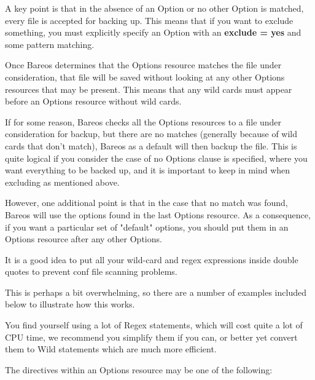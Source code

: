 A key point is that in the absence of an Option or no other Option is
matched, every file is accepted for backing up. This means that if
you want to exclude something, you must explicitly specify an Option
with an {\bf exclude = yes} and some pattern matching.

Once Bareos determines that the Options resource matches the file under
consideration, that file will be saved without looking at any other Options
resources that may be present.  This means that any wild cards must appear
before an Options resource without wild cards.

If for some reason, Bareos checks all the Options resources to a file under
consideration for backup, but there are no matches (generally because of wild
cards that don't match), Bareos as a default will then backup the file.  This
is quite logical if you consider the case of no Options clause is specified,
where you want everything to be backed up, and it is important to keep in mind
when excluding as mentioned above.

However, one additional point is that in the case that no match was found,
Bareos will use the options found in the last Options resource.  As a
consequence, if you want a particular set of "default" options, you should put
them in an Options resource after any other Options.

It is a good idea to put all your wild-card and regex expressions inside
double quotes to prevent conf file scanning problems.

This is perhaps a bit overwhelming, so there are a number of examples included
below to illustrate how this works.

You find yourself using a lot of Regex statements, which will cost quite a lot
of CPU time, we recommend you simplify them if you can, or better yet
convert them to Wild statements which are much more efficient.

The directives within an Options resource may be one of the following:

